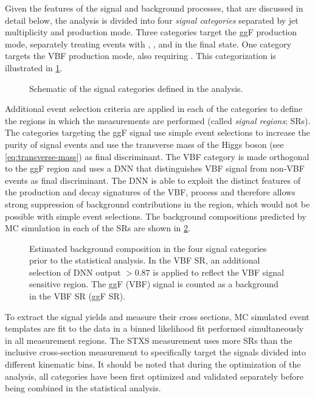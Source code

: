 Given the features of the signal and background processes, that are discussed in detail below, the analysis is divided into four \emph{signal categories} separated by jet multiplicity and production mode.
Three categories target the ggF production mode, separately treating events with \ZeroJet, \OneJet, and \TwoJet in the final state. One category targets the VBF production mode, also requiring \TwoJet. 
This categorization is illustrated in \cref{fig:signal-categorization}.
\begin{figure}[ht]
    \caption{Schematic of the signal categories defined in the \HWW analysis.}
    \label{fig:signal-categorization}
\end{figure}
Additional event selection criteria are applied in each of the categories to define the regions in which the measurements are performed (called \emph{signal regions}; SRs).
The categories targeting the ggF signal use simple event selections to increase the purity of signal events and use the transverse mass of the Higgs boson (see \cref{eq:transverse-mass}) as final discriminant.
The VBF \TwoJet category is made orthogonal to the ggF \TwoJet region and uses a DNN that distinguishes VBF signal from non-VBF events as final discriminant.
The DNN is able to exploit the distinct features of the production and decay signatures of the VBF, \HWW process and therefore allows strong suppression of background contributions in the \TwoJet region, which would not be possible with simple event selections. 
The background compositions predicted by MC simulation in each of the SRs are shown in \cref{fig:bkg-composition}.
\begin{figure}[ht]
     \hfill
    \caption[Estimated background composition in the four signal categories.]{Estimated background composition in the four signal categories prior to the statistical analysis. In the VBF \TwoJet SR, an additional selection of DNN output $>0.87$ is applied to reflect the VBF signal sensitive region. The ggF (VBF) signal is counted as a background in the VBF SR (ggF SR).}
    \label{fig:bkg-composition}
\end{figure}

To extract the signal yields and measure their cross sections, MC simulated event templates are fit to the data in a binned likelihood fit performed simultaneously in all measurement regions.
The STXS measurement uses more SRs than the inclusive cross-section measurement to specifically target the signals divided into different kinematic bins. 
It should be noted that during the optimization of the analysis, all categories have been first optimized and validated separately before being combined in the statistical analysis.


